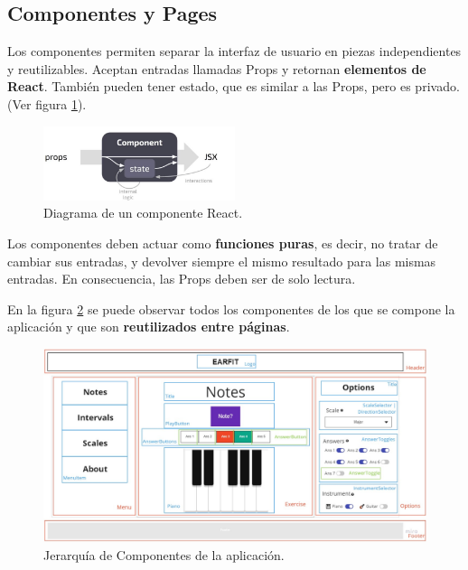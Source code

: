 \documentclass[12pt,twoside,titlepage]{report}
\begin{document}
\subsection{Componentes y Pages}
\label{sec:componentes}

Los componentes permiten separar la interfaz de usuario en piezas independientes y reutilizables. Aceptan entradas llamadas Props y retornan \textbf{elementos de React}. También pueden tener estado, que es similar a las Props, pero es privado.
(Ver figura \ref{fig:ReactComponent}).

\begin{figure}[H]
    \centering
    \includegraphics[width=0.5\textwidth]{React/ReactComponent}
    \caption{Diagrama de un componente React.}
    \label{fig:ReactComponent}
\end{figure}

Los componentes deben actuar como \textbf{funciones puras}, es decir, no tratar de cambiar sus entradas, y devolver siempre el mismo resultado para las mismas entradas. En consecuencia, las Props deben ser de solo lectura. 
\cite{components1}

En la figura \ref{fig:JerarquiaComponentes} se puede observar todos los componentes de los que se compone la aplicación y que son \textbf{reutilizados entre páginas}.

\begin{figure}[H]
    \centering
    \includegraphics[scale=0.28]{Detalles de Implementación/JerarquíaComponentes}
    \caption{Jerarquía de Componentes de la aplicación.}
    \label{fig:JerarquiaComponentes}
\end{figure}
\end{document}
